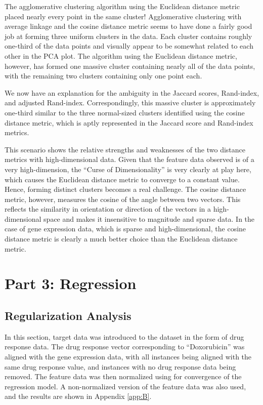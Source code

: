 \documentclass[11pt]{article}
\begin{document}
\vspace{-0.5cm}

The agglomerative clustering algorithm using the Euclidean distance metric placed nearly every point in the same cluster! Agglomerative clustering with average linkage and the cosine distance metric seems to have done a fairly good job at forming three uniform clusters in the data. Each cluster contains roughly one-third of the data points and visually appear to be somewhat related to each other in the PCA plot. The algorithm using the Euclidean distance metric, however, has formed one massive cluster containing nearly all of the data points, with the remaining two clusters containing only one point each. 

We now have an explanation for the ambiguity in the Jaccard scores, Rand-index, and adjusted Rand-index. Correspondingly, this massive cluster is approximately one-third similar to the three normal-sized clusters identified using the cosine distance metric, which is aptly represented in the Jaccard score and Rand-index metrics. 

This scenario shows the relative strengths and weaknesses of the two distance metrics with high-dimensional data. Given that the feature data observed is of a very high-dimension, the ``Curse of Dimensionality'' is very clearly at play here, which causes the Euclidean distance metric to converge to a constant value. Hence, forming distinct clusters becomes a real challenge. The cosine distance metric, however, measures the cosine of the angle between two vectors. This reflects the similarity in orientation or direction of the vectors in a high-dimensional space and makes it insensitive to magnitude and sparse data. In the case of gene expression data, which is sparse and high-dimensional, the cosine distance metric is clearly a much better choice than the Euclidean distance metric.
    
\section{Part 3: Regression}

\subsection{Regularization Analysis}
In this section, target data was introduced to the dataset in the form of drug response data. The drug response vector corresponding to ``Doxorubicin'' was aligned with the gene expression data, with all instances being aligned with the same drug response value, and instances with no drug response data being removed. The feature data was then normalized using for convergence of the regression model. A non-normalized version of the feature data was also used, and the results are shown in Appendix \ref{app:B}.
\end{document}
